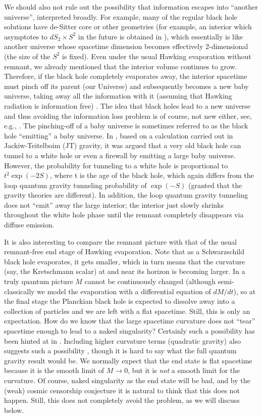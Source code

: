 \documentclass[12pt,preprintnumbers, floatfix, preprintnumbers, letterpaper, superscriptaddress,nofootinbib]{revtex4-2}
\begin{document}
We should also not rule out the possibility that information escapes into ``another universe'', interpreted broadly. For example, many of the regular black hole solutions have de-Sitter core or other geometries (for example, an interior which asymptotes to $dS_2 \times S^2$ in the future is obtained in \cite{2005.13260}), which essentially is like another universe whose spacetime dimension becomes effectively 2-dimensional (the size of the $S^2$ is fixed). Even under the usual Hawking evaporation without remnant, we already mentioned that the interior volume continues to grow. Therefore, if the black hole completely evaporates away, the interior spacetime must pinch off its parent (our Universe) and subsequently becomes a new baby universe, taking away all the information with it (assuming that Hawking radiation is information free) \cite{9405007v2}. The idea that black holes lead to a new universe and thus avoiding the information loss problem is of course, not new either, see, e.g., \cite{0103019}. The pinching-off of a baby universe is sometimes referred to as the black hole ``emitting'' a baby universe. In \cite{2208.01625}, based on a calculation carried out in Jackiw-Teitelboim (JT) gravity, it was argued that a very old black hole can tunnel to a white hole or even a firewall by emitting a large baby universe. However, the probability for tunneling to a white hole is proportional to $t^2\exp{(-2S)}$, where t is the age of the black hole, which again differs from the loop quantum gravity tunneling probability of $\exp{(-S)}$ \cite{2407.09584} (granted that the gravity theories are different). In addition, the loop quantum gravity tunneling does not ``emit'' away the large interior; the interior just slowly shrinks throughout the white hole phase until the remnant completely disappears via diffuse emission.

It is also interesting to compare the remnant picture with that of the usual remnant-free end stage of Hawking evaporation. Note that as a Schwarzschild black hole evaporates, it gets smaller, which in turn means that the curvature (say, the Kretschmann scalar) at and near its horizon is becoming larger. In a truly quantum picture $M$ cannot be continuously changed (although semi-classically we model the evaporation with a differential equation of $dM/dt$), so at the final stage the Planckian black hole is expected to dissolve away into a collection of particles and we are left with a flat spacetime. Still, this is only an expectation. How do we know that the large spacetime curvature does not ``tear'' spacetime enough to lead to a naked singularity? Certainly such a possibility has been hinted at in \cite{russo, hiscock}.
Including higher curvature terms (quadratic gravity) also suggests such a possibility \cite{2409.16690}, though it is hard to say what the full quantum gravity result would be. 
We normally expect that the end state is flat spacetime because it is the smooth limit of $M \to 0$, but it is \emph{not} a smooth limit for the curvature. Of course, naked singularity as the end state will be bad, and by the (weak) cosmic censorship conjecture it is natural to think that this does not happen. Still, this does not completely avoid the problem, as we will discuss below.
\end{document}
